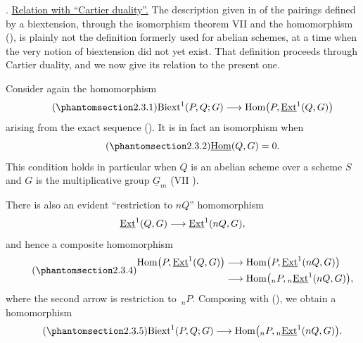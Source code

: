 
. \underline{Relation with ``Cartier duality''.}
The description given in  of the pairings defined by a
biextension, through the isomorphism theorem VII  and the
homomorphism (), is plainly not the definition formerly used for
abelian schemes, at a time when the very notion of biextension did not
yet exist.  That definition proceeds through Cartier duality, and we
now give its relation to the present one.

Consider again the homomorphism
\begin{equation}\tag{\SGARefTarget{sga7.sga7i.eviii.n2-3-1}{2.3.1}}
 \mathrm{Biext}^1(P,Q;G)
 \longrightarrow
 \operatorname{Hom}\bigl(P,\uExt^1(Q,G)\bigr)
\end{equation}
arising from the exact sequence ().  It is in fact an isomorphism
when
\begin{equation}\tag{\SGARefTarget{sga7.sga7i.eviii.n2-3-2}{2.3.2}}
 \uHom(Q,G)=0.
\end{equation}
This condition holds in particular when $Q$ is an abelian scheme over
a scheme $S$ and $G$ is the multiplicative group $\underline G_m$
(VII ).

There is also an evident ``restriction to $nQ$'' homomorphism
\[
 \uExt^1(Q,G)\longrightarrow\uExt^1(nQ,G),
\]
and hence a composite homomorphism
\begin{equation}\tag{\SGARefTarget{sga7.sga7i.eviii.n2-3-4}{2.3.4}}
\begin{split}
 \operatorname{Hom}\bigl(P,\uExt^1(Q,G)\bigr)
 &\longrightarrow
 \operatorname{Hom}\bigl(P,\uExt^1(nQ,G)\bigr)\\
 &\longrightarrow
 \operatorname{Hom}\bigl({}_nP,{}_n\uExt^1(nQ,G)\bigr),
\end{split}
\end{equation}
where the second arrow is restriction to $\,{}_nP$.  Composing with
(), we obtain a homomorphism
\begin{equation}\tag{\SGARefTarget{sga7.sga7i.eviii.n2-3-5}{2.3.5}}
 \mathrm{Biext}^1(P,Q;G)
 \longrightarrow
 \operatorname{Hom}\bigl({}_nP,{}_n\uExt^1(nQ,G)\bigr).
\end{equation}

